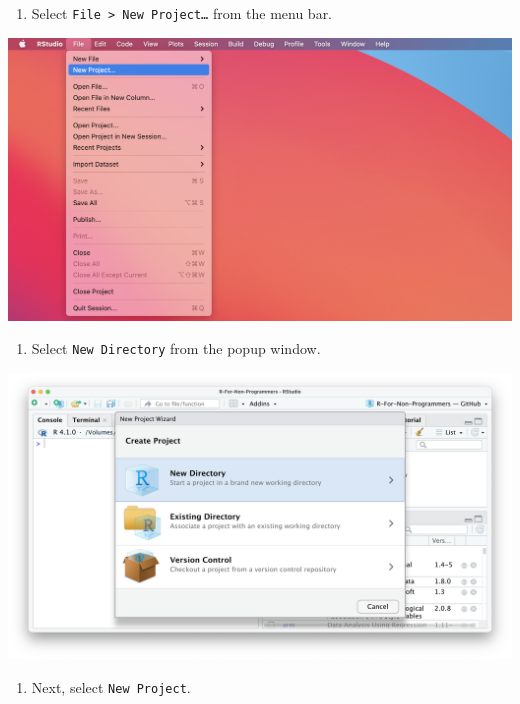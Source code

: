 \documentclass[
  letterpaper,
]{krantz}
\providecommand{\tightlist}{%
  \setlength{\itemsep}{0pt}\setlength{\parskip}{0pt}}\usepackage{longtable,booktabs,array}
\begin{document}
\begin{enumerate}
\def\labelenumi{\arabic{enumi}.}
\tightlist
\item
  Select \texttt{File\ \textgreater{}\ New\ Project…} from the menu bar.
\end{enumerate}

\includegraphics{images/chapter_06_img/00_r_project/00_r_project_file_menu.png}

\begin{enumerate}
\def\labelenumi{\arabic{enumi}.}
\setcounter{enumi}{1}
\tightlist
\item
  Select \texttt{New\ Directory} from the popup window.
\end{enumerate}

\includegraphics{images/chapter_06_img/00_r_project/01_r_project_new_directory.png}

\begin{enumerate}
\def\labelenumi{\arabic{enumi}.}
\setcounter{enumi}{2}
\tightlist
\item
  Next, select \texttt{New\ Project}.
\end{enumerate}
\end{document}

